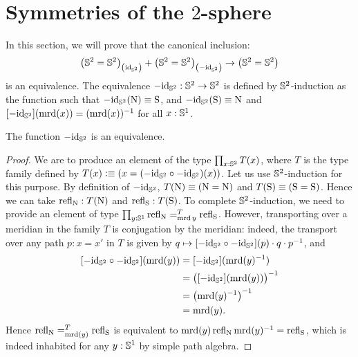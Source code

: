 \documentclass[english,a4paper]{lmcs}
\begin{document}
\section{Symmetries of the \texorpdfstring{$2$}{2}-sphere}
\label{sec:sphere}

In this section, we will prove that the canonical inclusion:
\begin{equation}
  \label{eq:goal-section-sphere}
  \conncomp{\left(\Sp = \Sp\right)}{\id_\Sp} +
  \conncomp{\left(\Sp = \Sp\right)}{-\id_\Sp}
  \to
  \left(\Sp = \Sp\right)
\end{equation}
is an equivalence. The equivalence $-\mathord{\mathrm{id}}_{{\mathbb S^{2}}} : {{\mathbb S^{2}}} \to {{\mathbb S^{2}}}$ is
defined by ${{\mathbb S^{2}}}$-induction as the function such that
$-\mathord{\mathrm{id}}_{{\mathbb S^{2}}}(\mathrm{N}) \equiv \mathrm{S}$, and $-\mathord{\mathrm{id}}_{{\mathbb S^{2}}}(\mathrm{S}) \equiv \mathrm{N}$ and
$\mathop{\left[{-\mathord{\mathrm{id}}_{{\mathbb S^{2}}}}\right]}(\operatorname{\mathrm{mrd}}(x)) = (\operatorname{\mathrm{mrd}}(x))^{-1}$ for all $x:{{\mathbb S^{1}}}$.

\begin{lem}
  The function $-\mathord{\mathrm{id}}_{{\mathbb S^{2}}}$ is an equivalence.
  \label{lem:minus-id-equivalence}
\end{lem}
\begin{proof}
  We are to produce an element of the type $\prod_{x:{{\mathbb S^{2}}}}T(x)$,
  where $T$ is the type family defined by
  $T(x)\vcentcolon\equiv (x= (-\mathord{\mathrm{id}}_{{\mathbb S^{2}}} \circ -\mathord{\mathrm{id}}_{{\mathbb S^{2}}})(x))$.
  Let us use ${{\mathbb S^{2}}}$-induction for this purpose.
  By definition of $-\mathord{\mathrm{id}}_{{\mathbb S^{2}}}$,
  $T(\mathrm{N}) \equiv (\mathrm{N}=\mathrm{N})$
  and $T(\mathrm{S}) \equiv (\mathrm{S}=\mathrm{S})$.
  Hence we can take $\mathop{{\mathrm{refl}}_{\mathrm{N}}}:T(\mathrm{N})$
  and $\mathop{{\mathrm{refl}}_{\mathrm{S}}}:T(\mathrm{S})$.
  To complete ${{\mathbb S^{2}}}$-induction, we need to provide an element
  of type $\prod_{y:{{\mathbb S^{1}}}} \mathop{{\mathrm{refl}}_{\mathrm{N}}} =^{T}_{\operatorname{\mathrm{mrd}} y} \mathop{{\mathrm{refl}}_{\mathrm{S}}}$.
  However,
  transporting over a meridian in the family $T$ is conjugation by the
  meridian: indeed, the transport over any path $p:x=x'$ in $T$ is given by
  $q\mapsto \mathop{\left[{-\mathord{\mathrm{id}}_{{\mathbb S^{2}}} \circ -\mathord{\mathrm{id}}_{{\mathbb S^{2}}}}\right]}(p) \cdot q \cdot p^{-1}$, and
  \begin{align*}
    \ap{-\id_\Sp \circ -\id_\Sp} (\mrd(y))
     &= \ap{-\id_\Sp}(\inv {\mrd(y)})
    \\ &= \inv {\bigl( \ap{-\id_\Sp}(\mrd(y)) \bigr)}
    \\ &= \inv { \left( \inv{\mrd(y)} \right) }
    \\ &= \mrd(y).
  \end{align*}
  Hence $\mathop{{\mathrm{refl}}_{\mathrm{N}}} =^{T}_{\operatorname{\mathrm{mrd}}(y)} \mathop{{\mathrm{refl}}_{\mathrm{S}}}$
  is equivalent to
  $\operatorname{\mathrm{mrd}}(y)\mathop{{\mathrm{refl}}_{\mathrm{N}}} \operatorname{\mathrm{mrd}}(y)^{-1} = \mathop{{\mathrm{refl}}_{\mathrm{S}}}$, which is indeed inhabited for any
  $y:{{\mathbb S^{1}}}$ by simple path algebra.
\end{proof}
\end{document}
